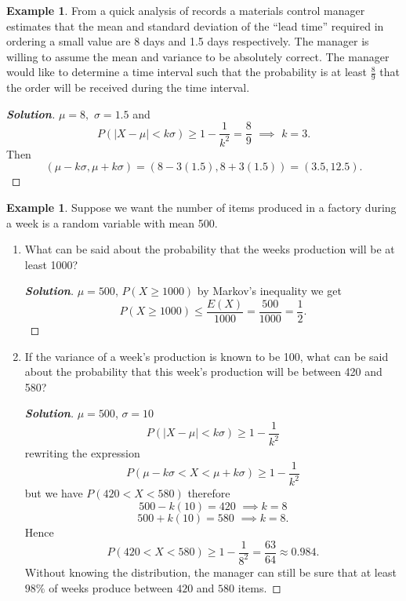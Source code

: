 \documentclass[12pt,a4paper]{report}
\theoremstyle{definition}
\newtheorem{example}[thm]{Example}
\theoremstyle{plain}
\theoremstyle{definition}
\begin{document}
\begin{example}
From a quick analysis of records a materials control manager estimates that the mean and standard deviation of the ``lead time'' required in ordering a small value are 8 days and 1.5 days respectively. The manager is willing to assume the mean and variance to be absolutely correct. The manager would like to determine a time interval such that the probability is at least $\frac{8}{9}$  that the order will be received during the time interval.
\end{example}

\begin{proof}[\textbf{\textit{Solution}}]
$\mu = 8, \,\, \sigma = 1.5$ and \[P(|X-\mu|<k\sigma) \geq 1-\frac{1}{k^2}=\frac{8}{9}\,\,\implies\,\, k=3.\]
Then 
\[(\mu-k\sigma,\mu+k\sigma)= (8-3(1.5),8+3(1.5)) =(3.5,12.5).\]
\end{proof}




\begin{example}
Suppose we want the number of items produced in a factory during a week is a random variable with mean 500.
\begin{enumerate}
\item What can be said about the probability that the weeks production will be at least 1000?
\begin{proof}[\textbf{\textit{Solution}}]
$\mu=500$, $P(X\geq 1000)$ by Markov's inequality we get \[P(X\geq 1000)\leq \frac{E(X)}{1000}=\frac{500}{1000}=\frac{1}{2}.\]
\end{proof}


\item If the variance of a week's production is known to be 100, what can be said about the probability that this week's production will be between 420 and 580?
\begin{proof}[\textbf{\textit{Solution}}]
$\mu=500$, $\sigma =10$
\[P(|X-\mu|<k\sigma)\geq 1-\frac{1}{k^2}\] rewriting the expression 
\[P(\mu -k\sigma < X < \mu + k\sigma)\geq 1-\frac{1}{k^2}\]
but we have $P(420 < X < 580)$
therefore
\[500-k(10)=420\,\,\implies k=8\] 
\[500+k(10)=580\,\,\implies k=8.\]
Hence \[P(420<X<580)\geq 1 - \frac{1}{8^2} = \frac{63}{64} \approx 0.984 .\]
Without knowing the distribution, the manager can still be sure that at least $98\%$ of weeks produce between $420$ and $580$ items.
\end{proof}
\end{enumerate}
\end{example}
\end{document}
